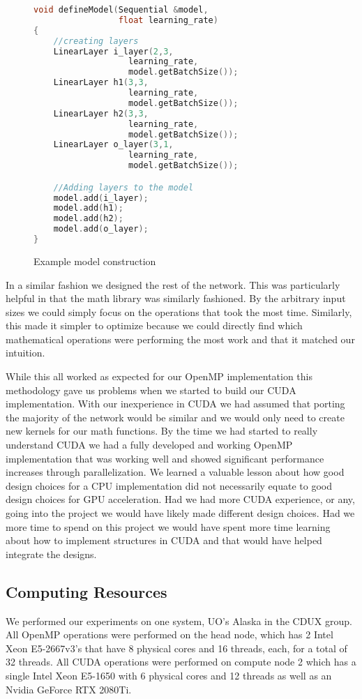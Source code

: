 \begin{figure}[ht]
\begin{lstlisting}[language=C++,
                   directivestyle={\color{black}},
                   emph={size_t, LinearLayer, defineModel, Sequential, float},
                   emphstyle={\color{blue}}]
void defineModel(Sequential &model, 
                 float learning_rate)
{
    //creating layers
    LinearLayer i_layer(2,3, 
                   learning_rate, 
                   model.getBatchSize());
    LinearLayer h1(3,3, 
                   learning_rate, 
                   model.getBatchSize());
    LinearLayer h2(3,3, 
                   learning_rate, 
                   model.getBatchSize());
    LinearLayer o_layer(3,1, 
                   learning_rate, 
                   model.getBatchSize());

    //Adding layers to the model
    model.add(i_layer);
    model.add(h1);
    model.add(h2);
    model.add(o_layer);
}
\end{lstlisting}
\caption{Example model construction}
\label{fig:model}
\end{figure}

In a similar fashion we designed the rest of the network. This was particularly
helpful in that the math library was similarly fashioned. By the arbitrary input
sizes we could simply focus on the operations that took the most time.
Similarly, this made it simpler to optimize because we could directly find which
mathematical operations were performing the most work and that it matched our
intuition. 

While this all worked as expected for our OpenMP implementation this methodology
gave us problems when we started to build our CUDA implementation. With our
inexperience in CUDA we had assumed that porting the majority of the network
would be similar and we would only need to create new kernels for our math
functions. By the time we had started to really understand CUDA we had a fully
developed and working OpenMP implementation that was working well and showed
significant performance increases through parallelization. We learned a valuable
lesson about how good design choices for a CPU implementation did not
necessarily equate to good design choices for GPU acceleration. Had we had more
CUDA experience, or any, going into the project we would have likely made
different design choices. Had we more time to spend on this project we would
have spent more time learning about how to implement structures in CUDA and that
would have helped integrate the designs. 

\subsection{Computing Resources}
We performed our experiments on one system, UO's Alaska in the CDUX group. All
OpenMP operations were performed on the head node, which has 2 Intel Xeon
E5-2667v3's that have 8 physical cores and 16 threads, each, for a total of 32
threads. All CUDA operations were performed on compute node 2 which has a single
Intel Xeon E5-1650 with 6 physical cores and 12 threads as well as an Nvidia
GeForce RTX 2080Ti. 
